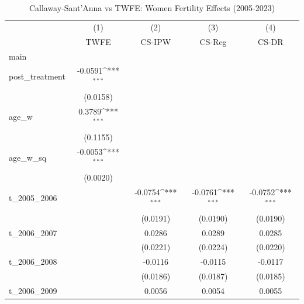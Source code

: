 \begin{table}[htbp]\centering
\def\sym#1{\ifmmode^{#1}\else\(^{#1}\)\fi}
\caption{Callaway-Sant'Anna vs TWFE: Women Fertility Effects (2005-2023)}
\begin{tabular}{l*{4}{c}}
\hline\hline
            &\multicolumn{1}{c}{(1)}&\multicolumn{1}{c}{(2)}&\multicolumn{1}{c}{(3)}&\multicolumn{1}{c}{(4)}\\
            &\multicolumn{1}{c}{TWFE}&\multicolumn{1}{c}{CS-IPW}&\multicolumn{1}{c}{CS-Reg}&\multicolumn{1}{c}{CS-DR}\\
\hline
main        &                     &                     &                     &                     \\
post\_treatment&     -0.0591\sym{***}&                     &                     &                     \\
            &    (0.0158)         &                     &                     &                     \\
[1em]
age\_w       &      0.3789\sym{***}&                     &                     &                     \\
            &    (0.1155)         &                     &                     &                     \\
[1em]
age\_w\_sq    &     -0.0053\sym{***}&                     &                     &                     \\
            &    (0.0020)         &                     &                     &                     \\
[1em]
t\_2005\_2006 &                     &     -0.0754\sym{***}&     -0.0761\sym{***}&     -0.0752\sym{***}\\
            &                     &    (0.0191)         &    (0.0190)         &    (0.0190)         \\
[1em]
t\_2006\_2007 &                     &      0.0286         &      0.0289         &      0.0285         \\
            &                     &    (0.0221)         &    (0.0224)         &    (0.0220)         \\
[1em]
t\_2006\_2008 &                     &     -0.0116         &     -0.0115         &     -0.0117         \\
            &                     &    (0.0186)         &    (0.0187)         &    (0.0185)         \\
[1em]
t\_2006\_2009 &                     &      0.0056         &      0.0054         &      0.0055         \\

\end{tabular}
\end{table}
